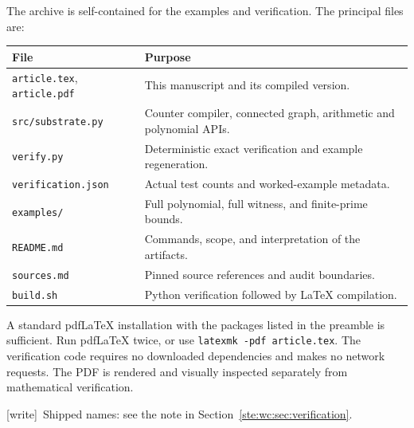 \documentclass[11pt,letterpaper]{article}
\theoremstyle{definition}
\theoremstyle{remark}
\newcommand{\wtag}{\textup{[write]}}
\begin{document}
The archive is self-contained for the examples and verification. The
principal files are:
\begin{center}
\begin{tabularx}{\linewidth}{@{}lX@{}}
\toprule
File&Purpose\\
\midrule
\texttt{article.tex}, \texttt{article.pdf}&This manuscript and its compiled version.\\
\texttt{src/substrate.py}&Counter compiler, connected graph, arithmetic and polynomial APIs.\\
\texttt{verify.py}&Deterministic exact verification and example regeneration.\\
\texttt{verification.json}&Actual test counts and worked-example metadata.\\
\texttt{examples/}&Full polynomial, full witness, and finite-prime bounds.\\
\texttt{README.md}&Commands, scope, and interpretation of the artifacts.\\
\texttt{sources.md}&Pinned source references and audit boundaries.\\
\texttt{build.sh}&Python verification followed by LaTeX compilation.\\
\bottomrule
\end{tabularx}
\end{center}
A standard pdfLaTeX installation with the packages listed in the preamble
is sufficient. Run pdfLaTeX twice, or use \texttt{latexmk -pdf article.tex}.
The verification code requires no downloaded dependencies and makes no
network requests. The PDF is rendered and visually inspected separately
from mathematical verification.

\wtag\ Shipped names: see the note in Section~\ref{ste:wc:sec:verification}.
\end{document}
